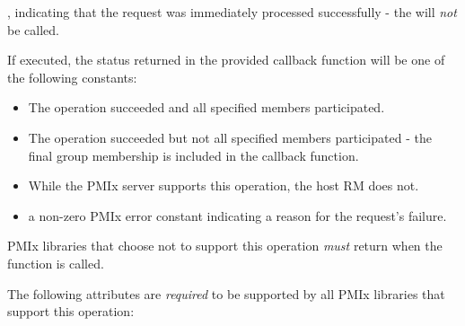 \begin{arglist}
\end{arglist}

\returnsimplenb

\returnstart
\begin{constantdesc}
\item {}, indicating that the request was immediately processed successfully - the  will \textit{not} be called.
\end{constantdesc}
\returnend

If executed, the status returned in the provided callback function will be one of the following constants:

\begin{itemize}
\item {} The operation succeeded and all specified members participated.
\item {} The operation succeeded but not all specified members participated - the final group membership is included in the callback function.
\item {} While the \ac{PMIx} server supports this operation, the host \ac{RM} does not.
\item a non-zero \ac{PMIx} error constant indicating a reason for the request's failure.
\end{itemize}

\reqattrstart
\ac{PMIx} libraries that choose not to support this operation \textit{must} return  when the function is called.

The following attributes are \textit{required} to be supported by all \ac{PMIx} libraries that support this operation:


